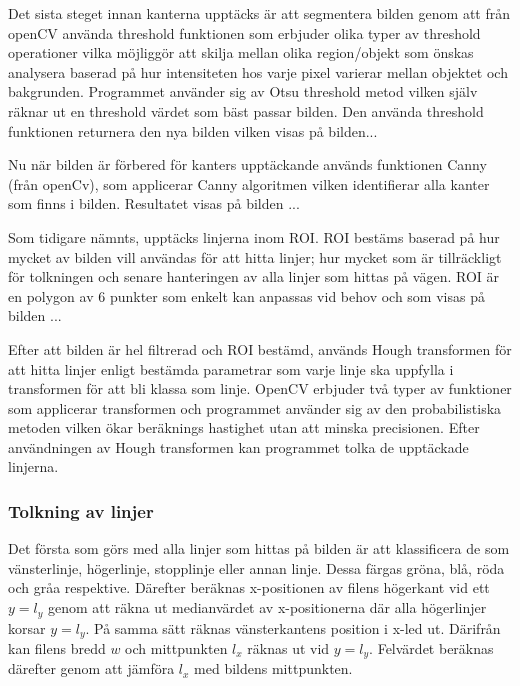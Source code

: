 \documentclass[tekniskrapport/tech.tex]{subfiles}
\begin{document}
Det sista steget innan kanterna upptäcks är att segmentera bilden genom att
från openCV använda threshold funktionen som erbjuder olika typer av threshold
operationer vilka möjliggör att skilja mellan olika region/objekt som önskas
analysera baserad på hur intensiteten hos varje pixel varierar mellan objektet
och bakgrunden. Programmet använder sig av Otsu threshold metod vilken själv
räknar ut en threshold värdet som bäst passar bilden. Den använda threshold
funktionen returnera den nya bilden vilken visas på bilden...

Nu när bilden är förbered för kanters upptäckande används funktionen Canny
(från openCv), som applicerar Canny algoritmen vilken identifierar alla kanter
som finns i bilden. Resultatet visas på bilden ... 

Som tidigare nämnts, upptäcks linjerna inom ROI. ROI bestäms baserad på hur
mycket av bilden vill användas för att hitta linjer; hur mycket som är
tillräckligt för tolkningen och senare hanteringen av alla linjer som hittas på
vägen. ROI är en polygon av 6 punkter som enkelt kan anpassas vid behov och som
visas på bilden ...   

Efter att bilden är hel filtrerad och ROI bestämd, används Hough transformen
för att hitta linjer enligt bestämda parametrar som varje linje ska uppfylla i
transformen för att bli klassa som linje. OpenCV erbjuder två typer av
funktioner som applicerar transformen och programmet använder sig av den
probabilistiska metoden vilken ökar beräknings hastighet utan att minska
precisionen. Efter användningen av Hough transformen kan programmet tolka de
upptäckade linjerna.

\subsubsection{Tolkning av linjer}
Det första som görs med alla linjer som hittas på bilden är att klassificera de
som vänsterlinje, högerlinje, stopplinje eller annan linje. Dessa färgas gröna,
blå, röda och gråa respektive. Därefter beräknas x-positionen av filens
högerkant vid ett $y=l_y$ genom att räkna ut medianvärdet av x-positionerna där
alla högerlinjer korsar $y=l_y$. På samma sätt räknas vänsterkantens position i
x-led ut. Därifrån kan filens bredd $w$ och mittpunkten $l_x$ räknas ut vid
$y=l_y$. Felvärdet beräknas därefter genom att jämföra $l_x$ med bildens
mittpunkten.
\end{document}
